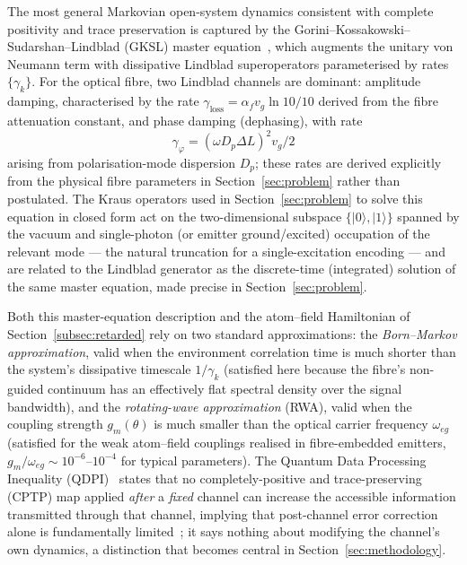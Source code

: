 \documentclass[journal,twocolumn]{IEEEtran}
\theoremstyle{definition}
\theoremstyle{plain}
\newcommand{\alphaf}{\alpha_{f}}
\begin{document}
The most general Markovian open-system dynamics consistent 
with complete positivity and trace preservation is captured by the
Gorini--Kossakowski--Sudarshan--Lindblad (GKSL) master
equation~\cite{gorini1976,lindblad1976}, which augments the
unitary von Neumann term with dissipative Lindblad superoperators
parameterised by rates $\{\gamma_k\}$.  For the optical fibre, two
Lindblad channels are dominant: amplitude damping, characterised
by the rate $\gamma_{\mathrm{loss}} = \alphaf v_g \ln 10 / 10$
derived from the fibre attenuation constant, and phase damping
(dephasing), with rate 
\[\gamma_\varphi = (\omega D_p \Delta L)^2
v_g / 2\] 
arising from polarisation-mode dispersion $D_p$; these
rates are derived explicitly from the physical fibre parameters in
Section~\ref{sec:problem} rather than postulated.  The Kraus
operators used in Section~\ref{sec:problem} to solve this equation
in closed form act on the two-dimensional subspace
$\{|0\rangle,|1\rangle\}$ spanned by the vacuum and single-photon
(or emitter ground/excited) occupation of the relevant mode --- the
natural truncation for a single-excitation encoding --- and are
related to the Lindblad generator as the discrete-time (integrated)
solution of the same master equation, made precise in
Section~\ref{sec:problem}. 

Both this master-equation description and
the atom--field Hamiltonian of Section~\ref{subsec:retarded} rely on
two standard approximations: the \emph{Born--Markov approximation},
valid when the environment correlation time is much shorter than the
system's dissipative timescale $1/\gamma_k$ (satisfied here because
the fibre's non-guided continuum has an effectively flat spectral
density over the signal bandwidth), and the \emph{rotating-wave
approximation} (RWA), valid when the coupling strength $g_m(\theta)$
is much smaller than the optical carrier frequency $\omega_{eg}$
(satisfied for the weak atom--field couplings realised in fibre-embedded
emitters, $g_m/\omega_{eg}\sim10^{-6}$--$10^{-4}$ for typical
parameters). The Quantum Data Processing Inequality (QDPI)~\cite{nielsen2000} states
that no completely-positive and trace-preserving (CPTP) map applied
\emph{after} a \emph{fixed} channel can increase the accessible
information transmitted through that channel, implying that
post-channel error correction alone is fundamentally
limited~\cite{giovannetti2014}; it says nothing about modifying the
channel's own dynamics, a distinction that becomes central in
Section~\ref{sec:methodology}.
\end{document}
